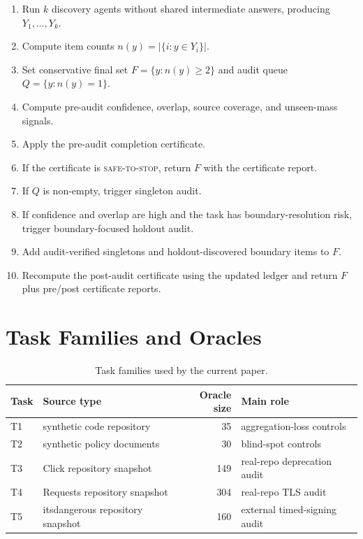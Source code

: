 \documentclass[letterpaper]{article}
\begin{document}
\begin{enumerate}
    \item Run $k$ discovery agents without shared intermediate answers,
    producing $Y_1,\ldots,Y_k$.
    \item Compute item counts $n(y)=|\{i:y\in Y_i\}|$.
    \item Set conservative final set $F=\{y:n(y)\ge2\}$ and audit queue
    $Q=\{y:n(y)=1\}$.
    \item Compute pre-audit confidence, overlap, source coverage, and
    unseen-mass signals.
    \item Apply the pre-audit completion certificate.
    \item If the certificate is \textsc{safe-to-stop}, return $F$ with the
    certificate report.
    \item If $Q$ is non-empty, trigger singleton audit.
    \item If confidence and overlap are high and the task has
    boundary-resolution risk, trigger boundary-focused holdout audit.
    \item Add audit-verified singletons and holdout-discovered boundary items
    to $F$.
    \item Recompute the post-audit certificate using the updated ledger and
    return $F$ plus pre/post certificate reports.
\end{enumerate}

\section{Task Families and Oracles}

\begin{table}[h]
\centering
\small
\begin{tabular}{llrl}
\toprule
Task & Source type & Oracle size & Main role \\
\midrule
T1 & synthetic code repository & 35 & aggregation-loss controls \\
T2 & synthetic policy documents & 30 & blind-spot controls \\
T3 & Click repository snapshot & 149 & real-repo deprecation audit \\
T4 & Requests repository snapshot & 304 & real-repo TLS audit \\
T5 & itsdangerous repository snapshot & 160 & external timed-signing audit \\
\bottomrule
\end{tabular}
\caption{Task families used by the current paper.}
\end{table}
\end{document}
